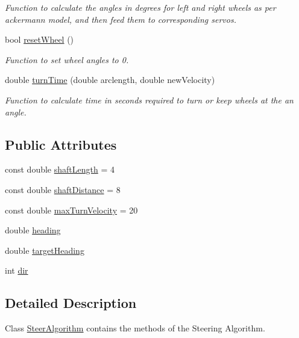 \begin{DoxyCompactItemize}
\begin{DoxyCompactList}\small\item\em Function to calculate the angles in degrees for left and right wheels as per ackermann model, and then feed them to corresponding servos. \end{DoxyCompactList}\item 
bool \hyperlink{class_steer_algorithm_ab251b6fd1f88fb7a526b0d55cd12625b}{reset\+Wheel} ()
\begin{DoxyCompactList}\small\item\em Function to set wheel angles to 0. \end{DoxyCompactList}\item 
double \hyperlink{class_steer_algorithm_aefdb433f65c47bf6e0d6af5de98c8f5a}{turn\+Time} (double arclength, double new\+Velocity)
\begin{DoxyCompactList}\small\item\em Function to calculate time in seconds required to turn or keep wheels at the an angle. \end{DoxyCompactList}\end{DoxyCompactItemize}
\subsection*{Public Attributes}
\begin{DoxyCompactItemize}
\item 
const double \hyperlink{class_steer_algorithm_a9d5bc20acba39f0e53c3d0f6fc280433}{shaft\+Length} = 4
\item 
const double \hyperlink{class_steer_algorithm_a38bc87552a30e8eda8f647cf341c9657}{shaft\+Distance} = 8
\item 
const double \hyperlink{class_steer_algorithm_acfce52839329f0ebb316f633494466e1}{max\+Turn\+Velocity} = 20
\item 
double \hyperlink{class_steer_algorithm_ada73b1f087245af5cda5d1d6b9be7d31}{heading}
\item 
double \hyperlink{class_steer_algorithm_a071efeb53e86ee949940b0ab10986044}{target\+Heading}
\item 
int \hyperlink{class_steer_algorithm_af6ad5604b62eec22cc2d385c7683d019}{dir}
\end{DoxyCompactItemize}


\subsection{Detailed Description}
Class \hyperlink{class_steer_algorithm}{Steer\+Algorithm} contains the methods of the Steering Algorithm. 

